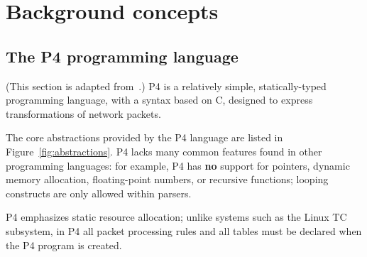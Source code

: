 \section{Background concepts}\label{sec:background}

\subsection{The P4 programming language}

(This section is adapted from~\cite{budiu-osr17}.)  P4 is a relatively
simple, statically-typed programming language, with a syntax based on
C, designed to express transformations of network packets.

The core abstractions provided by the P4 language are listed in
Figure~\ref{fig:abstractions}.  P4 lacks many common features found in
other programming languages: for example, P4 has \textbf{no} support
for pointers, dynamic memory allocation, floating-point numbers, or
recursive functions; looping constructs are only allowed within
parsers.

P4 emphasizes static resource allocation; unlike systems such as the
Linux TC subsystem, in P4 all packet processing rules and all tables
must be declared when the P4 program is created.

